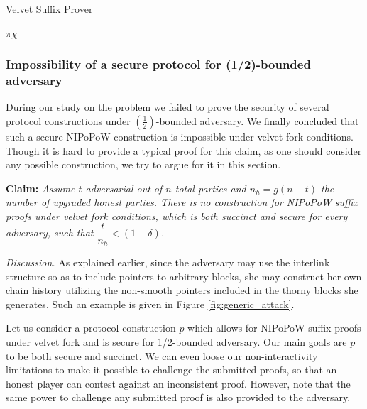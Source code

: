 \begin{algorithm}[h]
		\caption{\label{alg:velvet_suffix_prover}Velvet Suffix Prover}
		\begin{algorithmic}
						\Let{\pi}{\pi \cup \alpha}
					\EndFor
					\State\Return$\pi\chi$
				\EndFunction
		\end{algorithmic}
\end{algorithm}

\subsubsection{Impossibility of a secure protocol for (1/2)-bounded adversary}
During our study on the problem we failed to prove the security of several protocol
constructions under $(\frac{1}{2})$-bounded adversary. We finally concluded that
such a secure NIPoPoW construction is impossible under velvet fork conditions.
Though it is hard to provide a typical proof for this claim, as one should consider
any possible construction, we try to argue for it in this section.

\textbf{Claim:} \textit{Assume $t$ adversarial out of $n$ total parties and $n_h = g(n-t)$ the number of upgraded honest parties.
There is no construction for NIPoPoW suffix proofs under velvet fork conditions,
which is both succinct and secure for every adversary, such that
$\dfrac{t}{n_h} < (1 - \delta)$.}

\textit{Discussion.} As explained earlier, since the adversary may use the interlink structure so as to include pointers to arbitrary blocks,  she may construct her own
chain history utilizing the non-smooth pointers included in the thorny blocks she
generates. Such an example is given in Figure \ref{fig:generic_attack}.

Let us consider a protocol construction $p$ which allows for NIPoPoW suffix proofs
under velvet fork and is secure for 1/2-bounded adversary. Our main
goals are $p$ to be both secure and succinct. We can even loose our non-interactivity
limitations to make it possible to challenge the submitted proofs, so that an honest
player can contest against an inconsistent proof. However, note that the same power
to challenge any submitted proof is also provided to the adversary.

